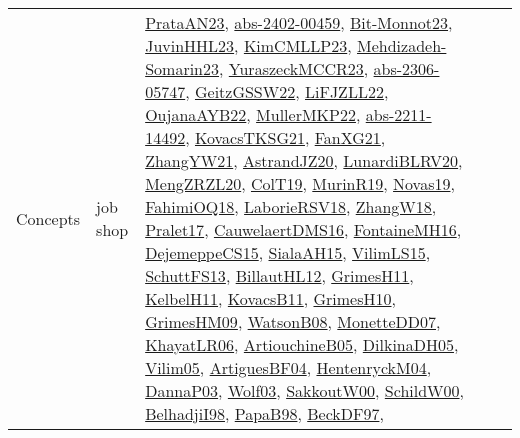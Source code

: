 {\begin{longtable}{llp{6cm}p{6cm}p{6cm}}
Concepts & job shop & \href{articles/PrataAN23.pdf}{PrataAN23}\cite{PrataAN23}, \href{articles/abs-2402-00459.pdf}{abs-2402-00459}\cite{abs-2402-00459}, \href{papers/Bit-Monnot23.pdf}{Bit-Monnot23}\cite{Bit-Monnot23}, \href{papers/JuvinHHL23.pdf}{JuvinHHL23}\cite{JuvinHHL23}, \href{papers/KimCMLLP23.pdf}{KimCMLLP23}\cite{KimCMLLP23}, \href{papers/Mehdizadeh-Somarin23.pdf}{Mehdizadeh-Somarin23}\cite{Mehdizadeh-Somarin23}, \href{articles/YuraszeckMCCR23.pdf}{YuraszeckMCCR23}\cite{YuraszeckMCCR23}, \href{articles/abs-2306-05747.pdf}{abs-2306-05747}\cite{abs-2306-05747}, \href{papers/GeitzGSSW22.pdf}{GeitzGSSW22}\cite{GeitzGSSW22}, \href{papers/LiFJZLL22.pdf}{LiFJZLL22}\cite{LiFJZLL22}, \href{papers/OujanaAYB22.pdf}{OujanaAYB22}\cite{OujanaAYB22}, \href{articles/MullerMKP22.pdf}{MullerMKP22}\cite{MullerMKP22}, \href{articles/abs-2211-14492.pdf}{abs-2211-14492}\cite{abs-2211-14492}, \href{papers/KovacsTKSG21.pdf}{KovacsTKSG21}\cite{KovacsTKSG21}, \href{articles/FanXG21.pdf}{FanXG21}\cite{FanXG21}, \href{articles/ZhangYW21.pdf}{ZhangYW21}\cite{ZhangYW21}, \href{articles/AstrandJZ20.pdf}{AstrandJZ20}\cite{AstrandJZ20}, \href{articles/LunardiBLRV20.pdf}{LunardiBLRV20}\cite{LunardiBLRV20}, \href{articles/MengZRZL20.pdf}{MengZRZL20}\cite{MengZRZL20}, \href{papers/ColT19.pdf}{ColT19}\cite{ColT19}, \href{papers/MurinR19.pdf}{MurinR19}\cite{MurinR19}, \href{articles/Novas19.pdf}{Novas19}\cite{Novas19}, \href{articles/FahimiOQ18.pdf}{FahimiOQ18}\cite{FahimiOQ18}, \href{articles/LaborieRSV18.pdf}{LaborieRSV18}\cite{LaborieRSV18}, \href{articles/ZhangW18.pdf}{ZhangW18}\cite{ZhangW18}, \href{papers/Pralet17.pdf}{Pralet17}\cite{Pralet17}, \href{papers/CauwelaertDMS16.pdf}{CauwelaertDMS16}\cite{CauwelaertDMS16}, \href{papers/FontaineMH16.pdf}{FontaineMH16}\cite{FontaineMH16}, \href{papers/DejemeppeCS15.pdf}{DejemeppeCS15}\cite{DejemeppeCS15}, \href{papers/SialaAH15.pdf}{SialaAH15}\cite{SialaAH15}, \href{papers/VilimLS15.pdf}{VilimLS15}\cite{VilimLS15}, \href{papers/SchuttFS13.pdf}{SchuttFS13}\cite{SchuttFS13}, \href{papers/BillautHL12.pdf}{BillautHL12}\cite{BillautHL12}, \href{papers/GrimesH11.pdf}{GrimesH11}\cite{GrimesH11}, \href{articles/KelbelH11.pdf}{KelbelH11}\cite{KelbelH11}, \href{articles/KovacsB11.pdf}{KovacsB11}\cite{KovacsB11}, \href{papers/GrimesH10.pdf}{GrimesH10}\cite{GrimesH10}, \href{papers/GrimesHM09.pdf}{GrimesHM09}\cite{GrimesHM09}, \href{papers/WatsonB08.pdf}{WatsonB08}\cite{WatsonB08}, \href{papers/MonetteDD07.pdf}{MonetteDD07}\cite{MonetteDD07}, \href{articles/KhayatLR06.pdf}{KhayatLR06}\cite{KhayatLR06}, \href{papers/ArtiouchineB05.pdf}{ArtiouchineB05}\cite{ArtiouchineB05}, \href{papers/DilkinaDH05.pdf}{DilkinaDH05}\cite{DilkinaDH05}, \href{papers/Vilim05.pdf}{Vilim05}\cite{Vilim05}, \href{papers/ArtiguesBF04.pdf}{ArtiguesBF04}\cite{ArtiguesBF04}, \href{papers/HentenryckM04.pdf}{HentenryckM04}\cite{HentenryckM04}, \href{papers/DannaP03.pdf}{DannaP03}\cite{DannaP03}, \href{papers/Wolf03.pdf}{Wolf03}\cite{Wolf03}, \href{articles/SakkoutW00.pdf}{SakkoutW00}\cite{SakkoutW00}, \href{articles/SchildW00.pdf}{SchildW00}\cite{SchildW00}, \href{articles/BelhadjiI98.pdf}{BelhadjiI98}\cite{BelhadjiI98}, \href{articles/PapaB98.pdf}{PapaB98}\cite{PapaB98}, \href{papers/BeckDF97.pdf}{BeckDF97}\cite{BeckDF97}, 
\end{longtable}}
